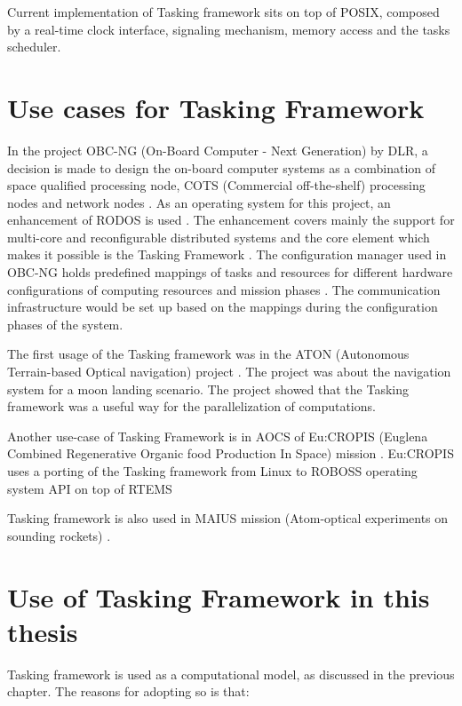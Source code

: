Current implementation of Tasking framework sits on top of POSIX, composed by a real-time clock interface, signaling mechanism, memory access and the tasks scheduler.

\section{Use cases for Tasking Framework}
In the project OBC-NG (On-Board Computer - Next Generation) by DLR, a decision is made to design the on-board computer systems as a combination of space qualified processing node, COTS (Commercial off-the-shelf) processing nodes and network nodes \cite{TaskFr}. As an operating system for this project, an enhancement of RODOS is used \cite{TaskFr, OBC-NG}. The enhancement covers mainly the support for multi-core and reconfigurable distributed systems \cite{RODOS} and the core element which makes it possible is the Tasking Framework \cite{TaskFr}. The configuration manager used in OBC-NG holds predefined mappings of tasks and resources for different hardware configurations of computing resources and mission phases \cite{OBC-NG}. The communication infrastructure would be set up based on the mappings during the configuration phases of the system. 

The first usage of the Tasking framework was in the ATON (Autonomous Terrain-based Optical navigation) project \cite{TaskFr}. The project was about the navigation system for a moon landing scenario. The project showed that the Tasking framework was a useful way for the parallelization of computations.

Another use-case of Tasking Framework is in AOCS of Eu:CROPIS (Euglena Combined Regenerative Organic food Production In Space) mission \cite{TETtoEUCROPIS}. Eu:CROPIS uses a porting of the Tasking framework from Linux to ROBOSS operating system API on top of RTEMS \cite{TETtoEUCROPIS}

Tasking framework is also used in MAIUS mission (Atom-optical experiments on sounding rockets) \cite{TETtoEUCROPIS}.

\section{Use of Tasking Framework in this thesis}
Tasking framework is used as a computational model, as discussed in the previous chapter. The reasons for adopting so is that:

